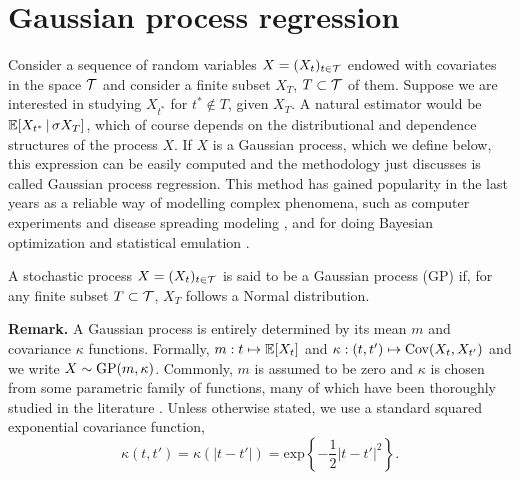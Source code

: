 

\section{Gaussian process regression} \label{section:GPs}


Consider a sequence of random variables $X = (X_t)_{t \in \mathcal{T}}$ endowed with covariates in the space $\mathcal{T}$ and consider a finite subset $X_T$, $T \subset \mathcal{T}$ of them. Suppose we are interested in studying $X_{t^{*}}$ for $t^{*} \notin T$, given $X_T$. A natural estimator would be $\mathbb{E} [X_{t^{*}} \, | \, \sigma X_T ]$, which of course depends on the distributional and dependence structures of the process $X$. If $X$ is a Gaussian process, which we define below, this expression can be easily computed and the methodology just discusses is called Gaussian process regression. This method has gained popularity in the last years as a reliable way of modelling complex phenomena, such as computer experiments \cite{SacksEtAl:1989:CompExp} and disease spreading modeling \cite{PokharelDeardon:2016:GPInfectDisease}, and for doing Bayesian optimization \cite{Frazier:2018:BayesOptTutorial} and statistical emulation \cite{WoodsEtAl:2017:ACEAlgorithm}.



\begin{definition} \label{def:GP}
	A stochastic process $X = (X_t)_{t \in \mathcal{T}}$ is said to be a Gaussian process (GP) if, for any finite subset $T \subset \mathcal{T}$, $X_T$ follows a Normal distribution. 
\end{definition}


\textbf{Remark.} A Gaussian process is entirely determined by its mean $m$ and covariance $\kappa$ functions. Formally, $m: t \mapsto \mathbb{E}[X_t]$ and $\kappa: (t, t') \mapsto \mathrm{Cov}(X_t, X_{t'})$ and we write $X \sim \mathrm{GP} (m, \kappa)$. Commonly, $m$ is assumed to be zero and $\kappa$ is chosen from some parametric family of functions, many of which have been thoroughly studied in the literature \cite[see][Ch.~4]{RasmussenWilliams:2006}. Unless otherwise stated, we use a standard squared exponential covariance function,
\begin{equation} \label{eq:sq_exp_cov}
	\kappa(t, t') = \kappa(|t-t'|) = \mathrm{exp} \left\{ -\frac{1}{2} |t-t'|^2 \right\}.
\end{equation}



